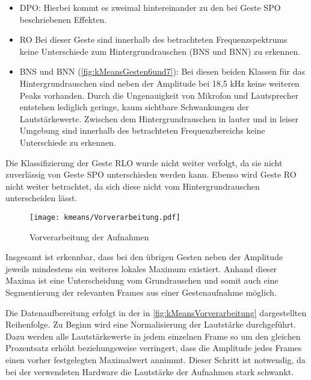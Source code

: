 \begin{itemize}
\item \ac{DPO}: Hierbei kommt es zweimal hintereinander zu den bei Geste \ac{SPO} beschriebenen Effekten.

\item \ac{RO} Bei dieser Geste sind innerhalb des betrachteten Frequenzspektrums keine Unterschiede zum Hintergrundrauschen (\ac{BNS} und \ac{BNN}) zu erkennen.

\item \ac{BNS} und \ac{BNN} (\autoref{fig:kMeansGesten6und7}): Bei diesen beiden Klassen für das Hintergrundrauschen sind neben der Amplitude bei 18,5 kHz keine weiteren Peaks vorhanden. Durch die Ungenauigkeit von Mikrofon und Lautsprecher entstehen lediglich geringe, kaum sichtbare Schwankungen der Lautstärkewerte. Zwischen dem Hintergrundrauschen in lauter und in leiser Umgebung sind innerhalb des betrachteten Frequenzbereichs keine Unterschiede zu erkennen.

\end{itemize}

Die Klassifizierung der Geste \ac{RLO} wurde nicht weiter verfolgt, da sie nicht zuverlässig von Geste \ac{SPO} unterschieden werden kann. Ebenso wird Geste \ac{RO} nicht weiter betrachtet, da sich diese nicht vom Hintergrundrauschen unterscheiden lässt.

\begin{figure*}[htbp]
    \centering
   \texttt{[image: kmeans/Vorverarbeitung.pdf]}
\caption{Vorverarbeitung der Aufnahmen}
\label{fig:kMeansVorverarbeitung}
\end{figure*}

Insgesamt ist erkennbar, dass bei den übrigen Gesten neben der Amplitude jeweils mindestens ein weiteres lokales Maximum existiert. Anhand dieser Maxima ist eine Unterscheidung vom Grundrauschen und somit auch eine Segmentierung der relevanten Frames aus einer Gestenaufnahme möglich.

Die Datenaufbereitung erfolgt in der in \autoref{fig:kMeansVorverarbeitung} dargestellten Reihenfolge. 
Zu Beginn wird eine Normalisierung der 
Lautstärke durchgeführt. Dazu werden alle Lautstärkewerte in jedem einzelnen Frame so um den gleichen Prozentsatz erhöht beziehungsweise verringert, dass die Amplitude jedes Frames einen vorher festgelegten Maximalwert annimmt. Dieser Schritt ist notwendig, da bei der verwendeten Hardware die Lautstärke der Aufnahmen stark schwankt.

